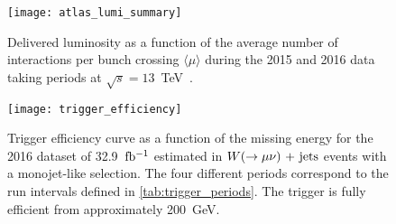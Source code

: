 \begin{figure}[!ht]
  \centering
    \texttt{[image: atlas\_lumi\_summary]}
    \caption{Delivered luminosity as a function of the average number of
      interactions per bunch crossing $\langle \mu \rangle$ during the 2015 and
      2016 data taking periods at $\sqrt{s} = 13$~TeV~\cite{LumiSummaryPlots}.}
    \label{fig:lumi_summary}
\end{figure}
\begin{figure}[!ht]
  \centering
    \texttt{[image: trigger\_efficiency]}
    \caption{Trigger efficiency curve as a function of the missing energy for
      the 2016 dataset of 32.9~$\mbox{fb$^{-1}$}$ estimated in $W (\rightarrow \mu \nu)\mathrm{~+~jets}$ events with
      a monojet-like selection. The four different periods correspond to the run
      intervals defined in \cref{tab:trigger_periods}. The trigger is fully
      efficient from approximately 200~GeV.}
    \label{fig:trigger_efficiency}
\end{figure}
